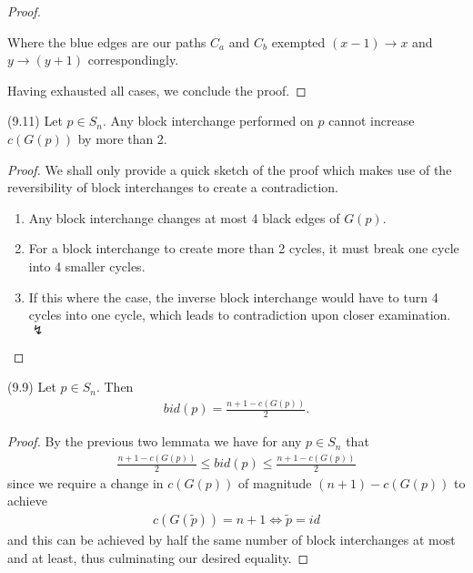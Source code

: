 \begin{proof}
\begin{enumerate}
\begin{enumerate}
Where the blue edges are our paths $C_a$ and $C_b$ exempted $(x-1) \to x$ and $y \to (y+1)$ correspondingly.

\end{enumerate}
\end{enumerate}

Having exhausted all cases, we conclude the proof.

\end{proof}

\begin{lemma} (9.11) Let $p \in S_n $. Any block interchange performed on $p$ cannot increase $c(G(p))$ by more than 2.

\end{lemma}


\begin{proof}
We shall only provide a quick sketch of the proof which makes use of the reversibility of block interchanges to create a contradiction.
\begin{enumerate}
\item Any block interchange changes at most 4 black edges of $G(p)$.
\item For a block interchange to create more than 2 cycles, it must break one cycle into 4 smaller cycles.
\item If this where the case, the inverse block interchange would have to turn 4 cycles into one cycle, which leads to contradiction upon closer examination. $\lightning$
\end{enumerate}
\end{proof}


\begin{theorem}
(9.9) Let $p \in S_n$. Then 
\begin{align*}
bid(p) = \frac{n+1-c(G(p))}{2} .
\end{align*}
\end{theorem}

\begin{proof}
By the previous two lemmata we have for any $p \in S_n$ that
\begin{align*}
\frac{n+1-c(G(p))}{2} \leq bid(p) \leq \frac{n+1-c(G(p))}{2}
\end{align*}
since we require a change in $c(G(p))$ of magnitude $( n+1)-c(G(p))$ to achieve 
\begin{align*}
c(G(\tilde{p}))=n+1 \iff \tilde{p} = id
\end{align*}
 and this can be achieved by half the same number of block interchanges at most and at least, thus culminating our desired equality.
\end{proof}


